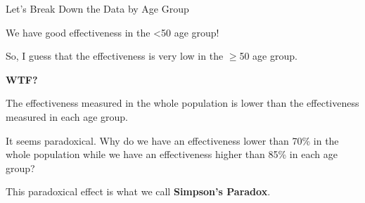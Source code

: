 \documentclass[8pt,aspectratio=169]{beamer}
\newcommand{\bs}{\vspace{\baselineskip}}
\begin{document}
\begin{frame}{Let's Break Down the Data by Age Group}


  \begin{overprint}


    


    

  \end{overprint}

  \bs

  \begin{overprint}


    We have good effectiveness in the <50 age group!

    \bs

    So, I guess that the effectiveness is very low in the $\ge$50 age group.


    \bs

    \begin{center}

      \Huge{\bfseries WTF?}

    \end{center}



    The effectiveness measured in the whole population is lower than the
    effectiveness measured in each age group.

    \bs

    It seems paradoxical. Why do we have an effectiveness lower than
    70\% in the whole population while we have an effectiveness higher than
    85\% in each age group?

    \bs

    This paradoxical effect is what we call {\bfseries \large Simpson's
    Paradox}.

  \end{overprint}

\end{frame}
\end{document}
